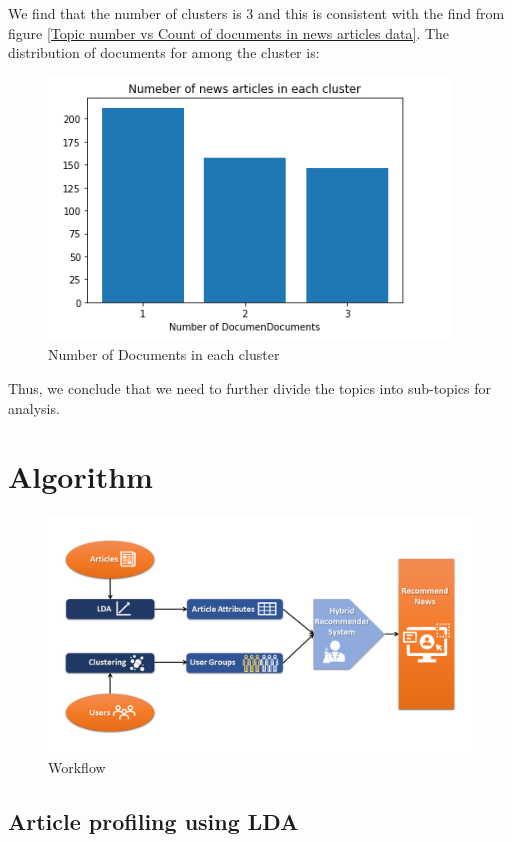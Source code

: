 \documentclass{article}
\begin{document}
We find that the number of clusters is 3 and this is consistent with the find from figure \ref{Topic number vs Count of documents in news articles data}. The distribution of documents for among the cluster  is:
\begin{figure}[H]
    \centering
    \includegraphics{cluster.PNG}
    \caption{Number of Documents in each cluster}
    \label{Number of Documents in each cluster}
\end{figure}



Thus, we conclude that we need to further divide the topics into sub-topics for analysis.


\section{Algorithm}

\begin{figure}[H]
\includegraphics[scale=.40]{NeuRIPS2019/Slide1.PNG}
\caption{Workflow}
\end{figure}

\subsection{Article profiling using LDA}
\end{document}
